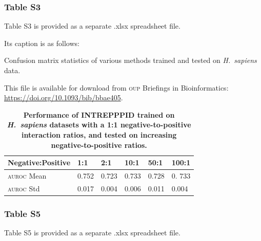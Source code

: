 \newpage

\subsubsection*{Table S3}
\label{sec:intrepppid_supp_s3}

Table S3 is provided as a separate .xlsx spreadsheet file.
\addtocounter{table}{1}

Its caption is as follows:

\begin{displayquote}
\begin{singlespace}
Confusion matrix statistics of various methods trained and tested on \textit{H.~sapiens} data.
\end{singlespace}
\end{displayquote}

\begin{tcolorbox}
    This file is available for download from \textsc{oup} Briefings in Bioinformatics:\\ \href{https://doi.org/10.1093/bib/bbae405}{https://doi.org/10.1093/bib/bbae405}.
\end{tcolorbox}

\newpage
\begin{table}[!h]
\centering
	\caption[Performance of \textsc{intrepppid} tested on increasing negative-to-positive ratios.]{\textsf{\textbf{Performance of INTREPPPID trained on \textit{H.~sapiens} datasets with a 1:1 negative-to-positive interaction ratios, and tested on increasing negative-to-positive ratios.}}} \label{tab:intrepppid_supp_neg_ratio} {\begin{tabular}{@{}llllll@{}}\toprule 
			Negative:Positive & 1:1 & 2:1 & 10:1 & 50:1 & 100:1  \\\midrule
			\textsc{auroc} Mean & 0.752 & 0.723 & 0.733 & 0.728 & 0. 733 \\
            \textsc{auroc} Std & 0.017 & 0.004 & 0.006 & 0.011 & 0.004\\
			\midrule
	\end{tabular}}{}

\end{table}

\newpage

\subsubsection*{Table S5}
\label{sec:intrepppid_supp_s5}

Table S5 is provided as a separate .xlsx spreadsheet file.
\addtocounter{table}{1}


